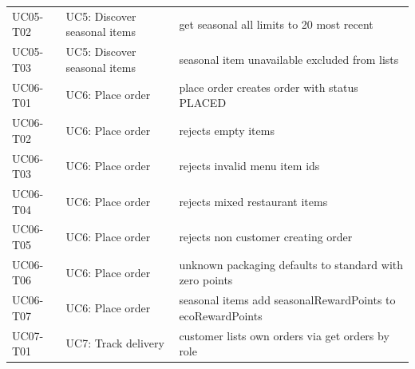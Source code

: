 \begin{table}[t]
\begin{tabular}{p{3.2cm}p{4.0cm}p{5.8cm}}
UC05-T02 & UC5: Discover seasonal items & get seasonal all limits to 20 most recent \\
UC05-T03 & UC5: Discover seasonal items & seasonal item unavailable excluded from lists \\
UC06-T01 & UC6: Place order & place order creates order with status PLACED \\
UC06-T02 & UC6: Place order & rejects empty items \\
UC06-T03 & UC6: Place order & rejects invalid menu item ids \\
UC06-T04 & UC6: Place order & rejects mixed restaurant items \\
UC06-T05 & UC6: Place order & rejects non customer creating order \\
UC06-T06 & UC6: Place order & unknown packaging defaults to standard with zero points \\
UC06-T07 & UC6: Place order & seasonal items add seasonalRewardPoints to ecoRewardPoints \\
UC07-T01 & UC7: Track delivery & customer lists own orders via get orders by role \\
\bottomrule
\end{tabular}
\end{table}

